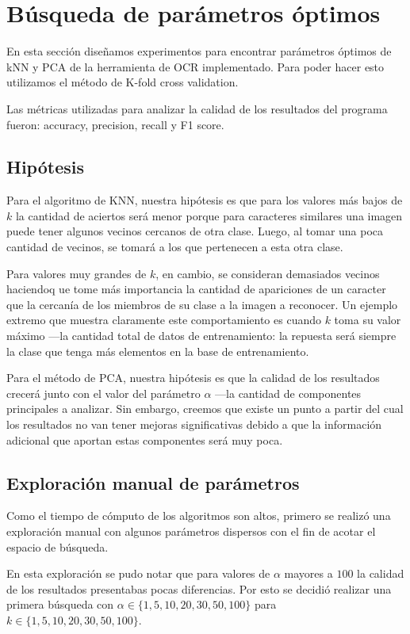 \section{Búsqueda de parámetros óptimos}

En esta sección diseñamos experimentos para encontrar parámetros óptimos de kNN y PCA de la herramienta de OCR implementado. Para poder hacer esto utilizamos el método de K-fold cross validation.

Las métricas utilizadas para analizar la calidad de los resultados del programa fueron: accuracy, precision, recall y F1 score.


\subsection{Hipótesis}
Para el algoritmo de KNN, nuestra hipótesis es que para los valores más bajos de $k$ la cantidad de aciertos será menor porque para caracteres similares una imagen puede tener algunos vecinos cercanos de otra clase. Luego, al tomar una poca cantidad de vecinos, se tomará a los que pertenecen a esta otra clase.

Para valores muy grandes de $k$, en cambio, se consideran demasiados vecinos haciendoq ue tome más importancia la cantidad de apariciones de un caracter que la cercanía de los miembros de su clase a la imagen a reconocer. Un ejemplo extremo que muestra claramente este comportamiento es cuando $k$ toma su valor máximo ---la cantidad total de datos de entrenamiento: la repuesta será siempre la clase que tenga más elementos en la base de entrenamiento.

Para el método de PCA, nuestra hipótesis es que la calidad de los resultados crecerá junto con el valor del parámetro $\alpha$ ---la cantidad de componentes principales a analizar. Sin embargo, creemos que existe un punto a partir del cual los resultados no van tener mejoras significativas debido a que la información adicional que aportan estas componentes será muy poca.

\subsection{Exploración manual de parámetros}

Como el tiempo de cómputo de los algoritmos son altos, primero se realizó una exploración manual con algunos parámetros dispersos con el fin de acotar el espacio de búsqueda.

En esta exploración se pudo notar que para valores de $\alpha$ mayores a $100$ la calidad de los resultados presentabas pocas diferencias. Por esto se decidió realizar una primera búsqueda con $\alpha \in \{1,5,10,20,30,50,100\}$ para $k \in \{1,5,10,20,30,50,100\}$.

